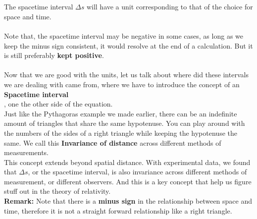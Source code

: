 \documentclass[12pt]{book}
\begin{document}
\\
\\
The spacetime interval $\Delta s$ will have a unit corresponding to that of the choice for space and time.
\\\\
Note that, the spacetime interval may be negative in some cases, as long as we keep the minus sign consistent, it would resolve at the end of a calculation. But it is still preferably \textbf{kept positive}.\\
\\
Now that we are good with the units, let us talk about where did these intervals we are dealing with came from, where we have to introduce the concept of an \textbf{Spacetime interval}\\, one the other side of the equation.
\\
\newline
Just like the Pythagoras example we made earlier, there can be an indefinite amount of triangles that share the same hypotenuse. You can play around with the numbers of the sides of a right triangle while keeping the hypotenuse the same. We call this \textbf{Invariance of distance} across different methods of measurements. \\
\newline
This concept extends beyond spatial distance. With experimental data, we found that $\Delta s$, or the spacetime interval, is also invariance across different methods of measurement, or different observers. And this is a key concept that help us figure stuff out in the theory of relativity. \\
\newline
\textbf{Remark: }Note that there is a \textbf{minus sign} in the relationship between space and time, therefore it is not a straight forward relationship like a right triangle.
\end{document}
